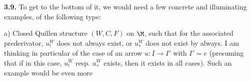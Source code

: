 \textbf{3.9.} To get to the bottom of it, we would need a few concrete and illuminating examples, of the following type:

a) Closed Quillen structure $(W,C,F)$ on $\M$, such that for the associated prederivator, $u^{W}_{!}$ does not always exist, or $u^{W}_{*}$ does not exist by always. I am thinking in particular of the case of an arrow $u : I\longrightarrow I'$ with $I'=e$ (presuming that if in this case, $u^{W}_{!}$ resp. $u^{W}_{*}$ exists, then it exists in all cases). Such an example would be even more %